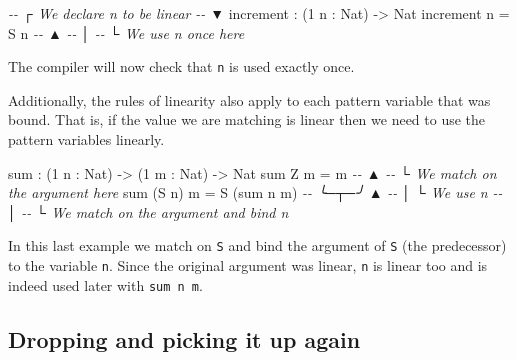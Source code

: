 \documentclass[
]{article}
\newenvironment{Shaded}{}{}
\newcommand{\CommentTok}[1]{\textcolor[rgb]{0.38,0.63,0.69}{\textit{#1}}}
\newcommand{\DataTypeTok}[1]{\textcolor[rgb]{0.56,0.13,0.00}{#1}}
\newcommand{\DecValTok}[1]{\textcolor[rgb]{0.25,0.63,0.44}{#1}}
\newcommand{\FunctionTok}[1]{\textcolor[rgb]{0.02,0.16,0.49}{#1}}
\newcommand{\NormalTok}[1]{#1}
\newcommand{\OperatorTok}[1]{\textcolor[rgb]{0.40,0.40,0.40}{#1}}
\newcommand{\OtherTok}[1]{\textcolor[rgb]{0.00,0.44,0.13}{#1}}
\begin{document}
\begin{Shaded}
\begin{Highlighting}[]
\CommentTok{{-}{-}           ┌ We declare \textasciigrave{}n\textasciigrave{} to be linear}
\CommentTok{{-}{-}           ▼}
\NormalTok{increment }\OperatorTok{:}\NormalTok{ (}\DecValTok{1}\NormalTok{ n }\OperatorTok{:} \DataTypeTok{Nat}\NormalTok{) }\OtherTok{{-}\textgreater{}} \DataTypeTok{Nat}
\NormalTok{increment n }\OtherTok{=} \DataTypeTok{S}\NormalTok{ n}
\CommentTok{{-}{-}              ▲}
\CommentTok{{-}{-}              │}
\CommentTok{{-}{-}              └ We use n once here}
\end{Highlighting}
\end{Shaded}

The compiler will now check that \texttt{n} is used exactly once.

Additionally, the rules of linearity also apply to each pattern variable
that was bound. That is, if the value we are matching is linear then we
need to use the pattern variables linearly.

\begin{Shaded}
\begin{Highlighting}[]
\FunctionTok{sum} \OperatorTok{:}\NormalTok{ (}\DecValTok{1}\NormalTok{ n }\OperatorTok{:} \DataTypeTok{Nat}\NormalTok{) }\OtherTok{{-}\textgreater{}}\NormalTok{ (}\DecValTok{1}\NormalTok{ m }\OperatorTok{:} \DataTypeTok{Nat}\NormalTok{) }\OtherTok{{-}\textgreater{}} \DataTypeTok{Nat}
\FunctionTok{sum} \DataTypeTok{Z}\NormalTok{ m }\OtherTok{=}\NormalTok{ m}
\CommentTok{{-}{-}  ▲}
\CommentTok{{-}{-}  └ We match on the argument here}
\FunctionTok{sum}\NormalTok{ (}\DataTypeTok{S}\NormalTok{ n) m }\OtherTok{=} \DataTypeTok{S}\NormalTok{ (}\FunctionTok{sum}\NormalTok{ n m)}
\CommentTok{{-}{-}  ╰─┬─╯            ▲}
\CommentTok{{-}{-}    │              └ We use \textasciigrave{}n\textasciigrave{}}
\CommentTok{{-}{-}    │}
\CommentTok{{-}{-}    └ We match on the argument and bind \textasciigrave{}n\textasciigrave{}}
\end{Highlighting}
\end{Shaded}

In this last example we match on \texttt{S} and bind the argument of
\texttt{S} (the predecessor) to the variable \texttt{n}. Since the
original argument was linear, \texttt{n} is linear too and is indeed
used later with \texttt{sum\ n\ m}.

\hypertarget{dropping-and-picking-it-up-again}{%
\subsection{Dropping and picking it up
again}\label{dropping-and-picking-it-up-again}}
\end{document}
